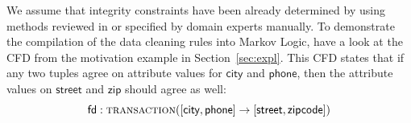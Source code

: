 
We assume that integrity constraints have been already determined by using methods reviewed in \cite{liu2012discover} or specified by domain experts manually. To demonstrate the compilation of the data cleaning rules into Markov Logic, have a look at the CFD from the motivation example in Section~\ref{sec:expl}. This CFD states that if any two tuples agree on attribute values for $\mathsf{\textsf{city}}$ and $\mathsf{\textsf{phone}}$, then the attribute values on $\mathsf{\textsf{street}}$ and $\mathsf{\textsf{zip}}$ should agree as well:
\begin{equation*}
\mathsf{fd: \textsc{transaction}([\textsf{city}, \textsf{phone}] \rightarrow [\textsf{street}, \textsf{zipcode}])}
\end{equation*}
\vspace*{-0.5cm}

